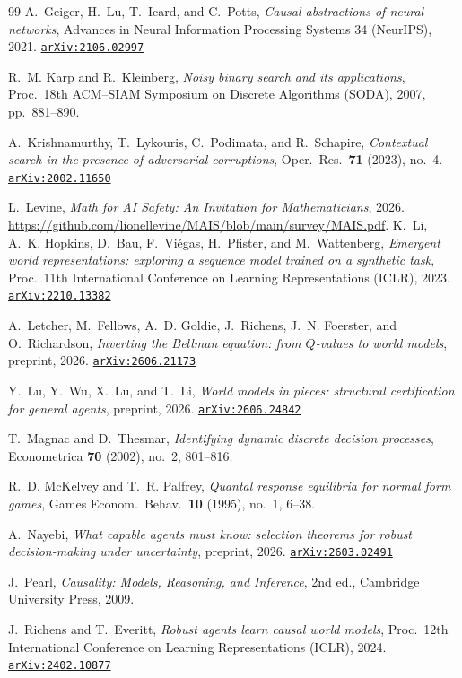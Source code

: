 \documentclass[11pt]{amsart}
\newcommand{\arxiv}[1]{\href{https://arxiv.org/abs/#1}{\texttt{arXiv:#1}}}
\theoremstyle{plain}
\theoremstyle{definition}
\begin{document}
\begin{thebibliography}{99}
A.~Geiger, H.~Lu, T.~Icard, and C.~Potts,
\emph{Causal abstractions of neural networks},
Advances in Neural Information Processing Systems 34 (NeurIPS), 2021. \arxiv{2106.02997}

R.~M. Karp and R.~Kleinberg,
\emph{Noisy binary search and its applications},
Proc.\ 18th ACM--SIAM Symposium on Discrete Algorithms (SODA), 2007, pp.~881--890.

A.~Krishnamurthy, T.~Lykouris, C.~Podimata, and R.~Schapire,
\emph{Contextual search in the presence of adversarial corruptions},
Oper.\ Res.\ \textbf{71} (2023), no.~4. \arxiv{2002.11650}

L.~Levine,
\emph{Math for AI Safety: An Invitation for Mathematicians},
2026. \url{https://github.com/lionellevine/MAIS/blob/main/survey/MAIS.pdf}.
K.~Li, A.~K. Hopkins, D.~Bau, F.~Vi\'egas, H.~Pfister, and M.~Wattenberg,
\emph{Emergent world representations: exploring a sequence model trained on a synthetic task},
Proc.\ 11th International Conference on Learning Representations (ICLR), 2023. \arxiv{2210.13382}

A.~Letcher, M.~Fellows, A.~D. Goldie, J.~Richens, J.~N. Foerster, and O.~Richardson,
\emph{Inverting the Bellman equation: from $Q$-values to world models},
preprint, 2026. \arxiv{2606.21173}

Y.~Lu, Y.~Wu, X.~Lu, and T.~Li,
\emph{World models in pieces: structural certification for general agents},
preprint, 2026. \arxiv{2606.24842}

T.~Magnac and D.~Thesmar,
\emph{Identifying dynamic discrete decision processes},
Econometrica \textbf{70} (2002), no.~2, 801--816.

R.~D. McKelvey and T.~R. Palfrey,
\emph{Quantal response equilibria for normal form games},
Games Econom.\ Behav.\ \textbf{10} (1995), no.~1, 6--38.

A.~Nayebi,
\emph{What capable agents must know: selection theorems for robust decision-making under uncertainty},
preprint, 2026. \arxiv{2603.02491}

J.~Pearl,
\emph{Causality: Models, Reasoning, and Inference},
2nd ed., Cambridge University Press, 2009.

J.~Richens and T.~Everitt,
\emph{Robust agents learn causal world models},
Proc.\ 12th International Conference on Learning Representations (ICLR), 2024. \arxiv{2402.10877}


\end{thebibliography}
\end{document}
